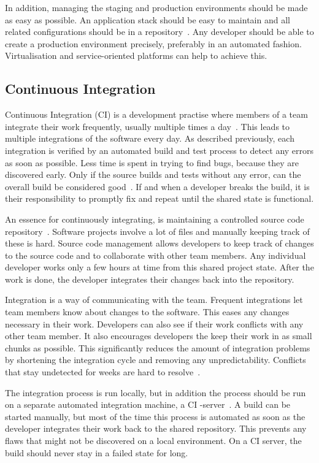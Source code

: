 \documentclass[english]{tktltiki2}
\begin{document}
In addition, managing the staging and production environments should be made as easy as possible. An application stack should be easy to maintain and all related configurations should be in a repository~\cite{HF11}. Any developer should be able to create a production environment precisely, preferably in an automated fashion. Virtualisation and service-oriented platforms can help to achieve this.

\subsection{Continuous Integration}

Continuous Integration (CI) is a development practise where members of a team integrate their work frequently, usually multiple times a day~\cite{Fow06}. This leads to multiple integrations of the software every day. As described previously, each integration is verified by an automated build and test process to detect any errors as soon as possible. Less time is spent in trying to find bugs, because they are discovered early. Only if the source builds and tests without any error, can the overall build be considered good~\cite{Fow06}. If and when a developer breaks the build, it is their responsibility to promptly fix and repeat until the shared state is functional.

An essence for continuously integrating, is maintaining a controlled source code repository~\cite{Fow06}. Software projects involve a lot of files and manually keeping track of these is hard. Source code management allows developers to keep track of changes to the source code and to collaborate with other team members. Any individual developer works only a few hours at time from this shared project state. After the work is done, the developer integrates their changes back into the repository.

Integration is a way of communicating with the team. Frequent integrations let team members know about changes to the software. This eases any changes necessary in their work. Developers can also see if their work conflicts with any other team member. It also encourages developers the keep their work in as small chunks as possible. This significantly reduces the amount of integration problems by shortening the integration cycle and removing any unpredictability. Conflicts that stay undetected for weeks are hard to resolve~\cite{Fow06}.

The integration process is run locally, but in addition the process should be run on a separate automated integration machine, a CI -server~\cite{Fow06}. A build can be started manually, but most of the time this process is automated as soon as the developer integrates their work back to the shared repository. This prevents any flaws that might not be discovered on a local environment. On a CI server, the build should never stay in a failed state for long.
\end{document}
